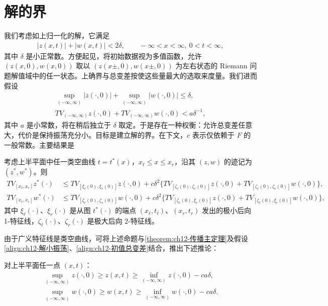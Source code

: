 \documentclass[../../main.tex]{subfiles}
\begin{document}
\section{解的界}\label{section:ch12-解的界}

我们考虑如上归一化的解，它满足
\begin{align}
|z(x,t)|+|w(x,t)|<2\delta,\qquad -\infty<x<\infty,\ 0<t<\infty,
\label{align:ch12-解小振荡}
\end{align}
其中 $\delta$ 是小正常数。方便起见，将初始数据视为多值函数，允许 $(z(x,0),w(x,0))$ 取以 $(z(x\pm,0),w(x\pm,0))$ 为左右状态的 Riemann 问题解值域中的任一状态。上确界与总变差按使这些量最大的选取来度量。我们进而假设
\begin{align}
\sup_{(-\infty,\infty)}|z(\cdot,0)|+\sup_{(-\infty,\infty)}|w(\cdot,0)|\leqslant\delta,
\label{align:ch12-初值上确界}\\
TV_{(-\infty,\infty)}z(\cdot,0)+TV_{(-\infty,\infty)}w(\cdot,0)<a\delta^{-1},
\label{align:ch12-初值总变差}
\end{align}
其中 $a$ 是小常数，将在稍后独立于 $\delta$ 取定。于是存在一种权衡：允许总变差任意大，代价是保持振荡充分小。目标是建立解的界。在下文，$c$ 表示仅依赖于 $F$ 的一般常数。主要结果是

\begin{theorem}\label{theorem:ch12-TV界}
考虑上半平面中任一类空曲线 $t=t^*(x)$，$x_\ell\leqslant x\leqslant x_r$，沿其 $(z,w)$ 的迹记为 $(z^*,w^*)$。则
\begin{align}
TV_{[x_\ell,x_r]}z^*(\cdot)&\leqslant TV_{[\xi_\ell(0),\xi_r(0)]}z(\cdot,0)+c\delta^2\{TV_{[\zeta_\ell(0),\zeta_r(0)]}z(\cdot,0)+TV_{[\zeta_\ell(0),\zeta_r(0)]}w(\cdot,0)\},
\label{align:ch12-TV界z}\\
TV_{[x_\ell,x_r]}w^*(\cdot)&\leqslant TV_{[\zeta_\ell(0),\zeta_r(0)]}w(\cdot,0)+c\delta^2\{TV_{[\zeta_\ell(0),\xi_r(0)]}z(\cdot,0)+TV_{[\zeta_\ell(0),\xi_r(0)]}w(\cdot,0)\},
\label{align:ch12-TV界w}
\end{align}
其中 $\xi_\ell(\cdot)$、$\xi_r(\cdot)$ 是从图 $t^*(\cdot)$ 的端点 $(x_\ell,t_\ell)$、$(x_r,t_r)$ 发出的极小后向 1-特征线，$\zeta_\ell(\cdot)$、$\zeta_r(\cdot)$ 是极大后向 2-特征线。
\end{theorem}

由于广义特征线是类空曲线，可将上述命题与\cref{theorem:ch12-传播主定理}及假设\eqref{align:ch12-解小振荡}、\eqref{align:ch12-初值总变差}结合，推出下述推论：

\begin{theorem}\label{theorem:ch12-逐点界}
对上半平面任一点 $(x,t)$：
\begin{align}
\sup_{(-\infty,\infty)}z(\cdot,0)\geqslant z(x,t)\geqslant\inf_{(-\infty,\infty)}z(\cdot,0)-ca\delta,
\label{align:ch12-逐点界z}\\
\sup_{(-\infty,\infty)}w(\cdot,0)\geqslant w(x,t)\geqslant\inf_{(-\infty,\infty)}w(\cdot,0)-ca\delta.
\label{align:ch12-逐点界w}
\end{align}
\end{theorem}
\end{document}
